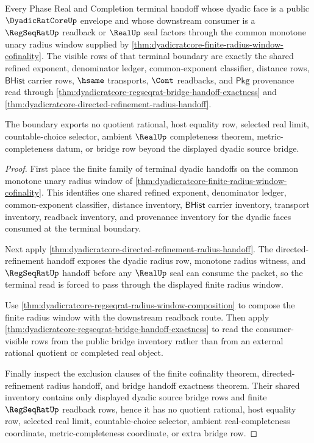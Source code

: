\begin{theorem}
\label{thm:dyadicratcore-regseqrat-terminal-radius-window-boundary}
Every Phase Real and Completion terminal handoff whose dyadic face is a public
$\DyadicRatCoreUp$ envelope and whose downstream consumer is a $\RegSeqRatUp$
readback or $\RealUp$ seal factors through the common monotone unary radius
window supplied by
\autoref{thm:dyadicratcore-finite-radius-window-cofinality}. The visible rows of
that terminal boundary are exactly the shared refined exponent, denominator
ledger, common-exponent classifier, distance rows, $\mathsf{BHist}$ carrier
rows, $\hsame$ transports, $\Cont$ readbacks, and $\mathsf{Pkg}$ provenance read
through \autoref{thm:dyadicratcore-regseqrat-bridge-handoff-exactness} and
\autoref{thm:dyadicratcore-directed-refinement-radius-handoff}.

The boundary exports no quotient rational, host equality row, selected real
limit, countable-choice selector, ambient $\RealUp$ completeness theorem,
metric-completeness datum, or bridge row beyond the displayed dyadic source
bridge.
\end{theorem}
\begin{proof}
First place the finite family of terminal dyadic handoffs on the common monotone
unary radius window of
\autoref{thm:dyadicratcore-finite-radius-window-cofinality}. This identifies
one shared refined exponent, denominator ledger, common-exponent classifier,
distance inventory, $\mathsf{BHist}$ carrier inventory, transport inventory,
readback inventory, and provenance inventory for the dyadic faces consumed at
the terminal boundary.

Next apply \autoref{thm:dyadicratcore-directed-refinement-radius-handoff}. The
directed-refinement handoff exposes the dyadic radius row, monotone radius
witness, and $\RegSeqRatUp$ handoff before any $\RealUp$ seal can consume the
packet, so the terminal read is forced to pass through the displayed finite
radius window.

Use \autoref{thm:dyadicratcore-regseqrat-radius-window-composition} to compose
the finite radius window with the downstream readback route. Then apply
\autoref{thm:dyadicratcore-regseqrat-bridge-handoff-exactness} to read the
consumer-visible rows from the public bridge inventory rather than from an
external rational quotient or completed real object.

Finally inspect the exclusion clauses of the finite cofinality theorem,
directed-refinement radius handoff, and bridge handoff exactness theorem. Their
shared inventory contains only displayed dyadic source bridge rows and finite
$\RegSeqRatUp$ readback rows, hence it has no quotient rational, host equality
row, selected real limit, countable-choice selector, ambient real-completeness
coordinate, metric-completeness coordinate, or extra bridge row.
\end{proof}


